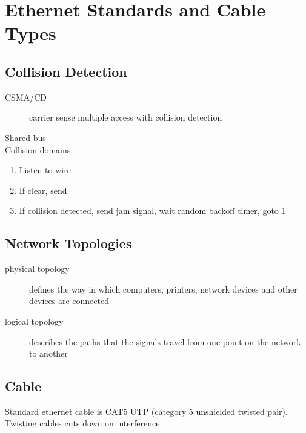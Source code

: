 \section{Ethernet Standards and Cable Types}

\subsection{Collision Detection}

\begin{description}

\item[CSMA/CD]
carrier sense multiple access with collision detection

\end{description}

Shared bus\\

Collision domains

\begin{enumerate}

\item Listen to wire
\item If clear, send
\item If collision detected, send jam signal, wait random backoff timer, goto 1

\end{enumerate}

\subsection{Network Topologies}

\begin{description}

\item[physical topology]
defines the way in which computers, printers, network devices and other devices
are connected

\item[logical topology]
describes the paths that the signals travel from one point on the network to
another

\end{description}

\subsection{Cable}

Standard ethernet cable is CAT5 UTP (category 5 unshielded twisted pair).
Twisting cables cuts down on interference.\\


